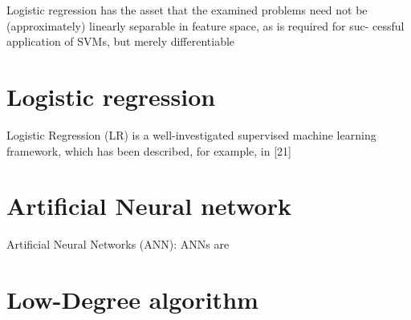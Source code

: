 Logistic regression has the asset that the examined problems need not be (approximately) linearly separable in feature space, as is required for suc- cessful application of SVMs, but merely differentiable \cite{Ruhrmair2010ModelingFunctions}


\section{Logistic regression}
\label{sec:lr}
Logistic Regression (LR) is a well-investigated supervised machine learning framework, which has been described, for example, in [21] \cite{Ruhrmair2010ModelingFunctions}


\section{Artificial Neural network}
\label{sec:neuralnetwork}

Artificial Neural Networks (ANN): ANNs are \cite{Hospodar2012MachineUsability}


\section{Low-Degree algorithm}
\label{sec:lowdegreealg}





